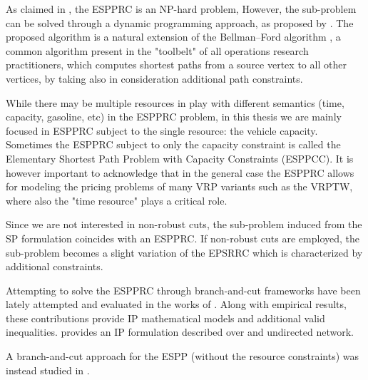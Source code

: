 As claimed in \textcite{dror1994}, the ESPPRC is an NP-hard problem,
However, the sub-problem can be solved through a dynamic programming approach, as proposed by \textcite{feillet2004}.
The proposed algorithm is a natural extension of the Bellman–Ford algorithm \parencite{bellman1958, fordjr1956},
a common algorithm present in the "toolbelt" of all operations research practitioners,
which computes shortest paths from a source vertex to all other vertices,
by taking also in consideration additional path constraints.

While there may be multiple resources in play with different semantics
(time, capacity, gasoline, etc)
in the ESPPRC problem,
in this thesis we are mainly focused in ESPPRC subject to the single resource: the vehicle capacity.
Sometimes the ESPPRC subject to only the capacity constraint is called the Elementary Shortest
Path Problem with Capacity Constraints (ESPPCC).
It is however important to acknowledge that in the general case the ESPPRC allows for modeling
the pricing problems of many VRP variants such as the VRPTW, where also the "time resource"
plays a critical role.

Since we are not interested in non-robust cuts, the sub-problem
induced from the SP formulation coincides with an ESPPRC.
If non-robust cuts are employed, the sub-problem becomes
a slight variation of the EPSRRC which is characterized by additional constraints.

Attempting to solve the ESPPRC through branch-and-cut frameworks
have been lately attempted and evaluated in the works of \textcite{jepsen2008}.
Along with empirical results,
these contributions provide IP mathematical models and additional valid inequalities.
\textcite{jepsen2008} provides an IP formulation described over and undirected network.

A branch-and-cut approach for the ESPP (without the resource constraints)
was instead studied in \textcite{taccari2016}.



\begin{comment}
\cite{bettinelli2010mathematical} ---------------
It is possible to address the pricing problem by optimizing its relaxation,
obtained by dropping the elementarity constraints. Solving a resource con-
strained shortest path problem (RCSPP) requires less computing time but
yields less tight lower bounds, since columns may include cycles. The two
different approaches have been followed for instance by Feillet et al. [42] and
Desrochers et al. [29] to solve the vehicle routing problem with time windows
(VRPTW) through column generation.
\end{comment}


